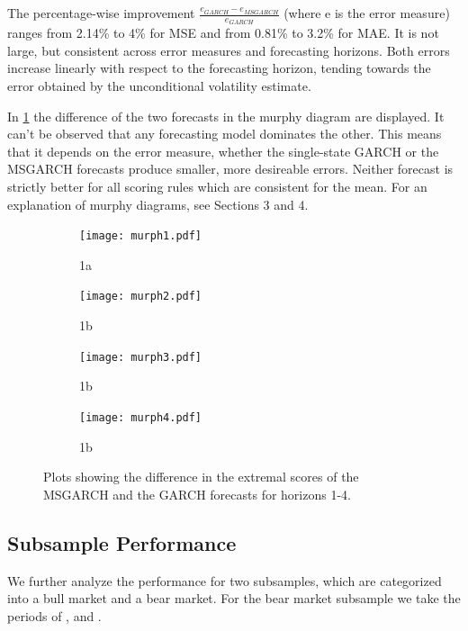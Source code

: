 \documentclass[11pt,a4paper]{article}
\begin{document}
The percentage-wise improvement $\frac{e_{GARCH}-e_{MSGARCH}}{e_{GARCH}}$ (where e is the error measure) ranges from 2.14\% to 4\% for MSE and from 0.81\% to 3.2\% for MAE. It is not large, but consistent across error measures and forecasting horizons.
Both errors increase linearly with respect to the forecasting horizon, tending towards the error obtained by the unconditional volatility estimate.



In \cref{fig:murphy-diagrams} the difference of the two forecasts in the murphy diagram are displayed. It can't be observed that any forecasting model dominates the other. This means that it depends on the error measure, whether the single-state GARCH or the MSGARCH forecasts produce smaller, more desireable errors.
Neither forecast is strictly better for all scoring rules which are consistent for the mean. For an explanation of murphy diagrams, see \cite{ehm_quantiles_2016} Sections 3 and 4.

\begin{figure}[H]
	\begin{subfigure}{.5\textwidth}
		\centering
		\texttt{[image: murph1.pdf]}
		\caption{1a}
	\end{subfigure}%
	\begin{subfigure}{.5\textwidth}
		\centering
		\texttt{[image: murph2.pdf]}
		\caption{1b}
	\end{subfigure}
	\begin{subfigure}{.5\textwidth}
	\centering
	\texttt{[image: murph3.pdf]}
	\caption{1b}
\end{subfigure}
	\begin{subfigure}{.5\textwidth}
	\centering
	\texttt{[image: murph4.pdf]}
	\caption{1b}
\end{subfigure}
	\caption{Plots showing the difference in the extremal scores of the MSGARCH and the GARCH forecasts for horizons 1-4.}
	\label{fig:murphy-diagrams}
\end{figure}


\subsection{Subsample Performance}
We further analyze the performance for two subsamples, which are categorized into a bull market and a bear market. For the bear market subsample we take the periods of 
 \textendash {},  \textendash {} and  \textendash {}.
\end{document}
